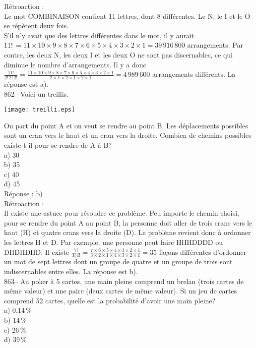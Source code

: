﻿\documentclass[letterpaper, 12pt]{article}
\begin{document}
R\'etroaction : \\
Le mot COMBINAISON contient 11 lettres, dont 8 diff\'erentes.  Le N, le I et
le O se r\'ep\`etent deux fois.\\
S'il n'y avait que des lettres diff\'erentes dans le mot, il y aurait
$11!\,=11\times10\times9\times8\times7\times6\times5\times4\times3\times2\times1=39\,916\,800$
arrangements.  Par contre, les deux N, les deux I et les deux O ne sont pas
discernables, ce qui diminue le nombre d'arrangements.  Il y a donc
$\frac{11!}{2!\,2!\,2!}=\frac{11\times10\times9\times8\times7\times6\times5\times4\times3\times2\times1}{2\times1\times2\times1\times2\times1}=4\,989\,600$
arrangements diff\'erents.  La r\'eponse est a).\\

862-- Voici un treillis.    \begin{center}
    \texttt{[image: treilli.eps]}
    \end{center}
On part du point A et on veut se rendre au point B.  Les d\'eplacements
possibles sont un cran vers le haut et un cran vers la droite.  Combien de
chemins possibles existe-t-il pour se rendre de A \`a B?\\
a) 30\\
b) 35\\
c) 40\\
d) 45\\

R\'eponse : b)\\

R\'etroaction : \\
Il existe une astuce pour r\'esoudre ce probl\`eme. Peu importe le chemin
choisi, pour se rendre du point A au point B, la personne doit aller de
trois crans vers le haut (H) et quatre crans vers la droite (D).  Le
probl\`eme revient donc \`a ordonner les lettres H et D.  Par exemple, une
personne peut faire HHHDDDD ou DHDHDHD.  Il existe
$\frac{7!}{3!\,4!}=\frac{7\times6\times5\times4\times3\times2\times1}{3\times2\times1\times4\times3\times2\times1}=35$
fa\c cons diff\'erentes d'ordonner un mot de sept lettres dont un groupe de
quatre et un groupe de trois sont indiscernables entre elles. La r\'eponse
est b).\\

863-- Au poker \`a 5 cartes, une main pleine comprend un brelan (trois
cartes de m\^eme valeur) et une paire (deux cartes de m\^eme valeur).  Si un
jeu de cartes comprend 52 cartes, quelle est la probabilit\'e d'avoir une
main pleine?\\
a) 0,14\,\%\\
b) 14\,\%\\
c) 26\,\%\\
d) 39\,\%\\
\end{document}
